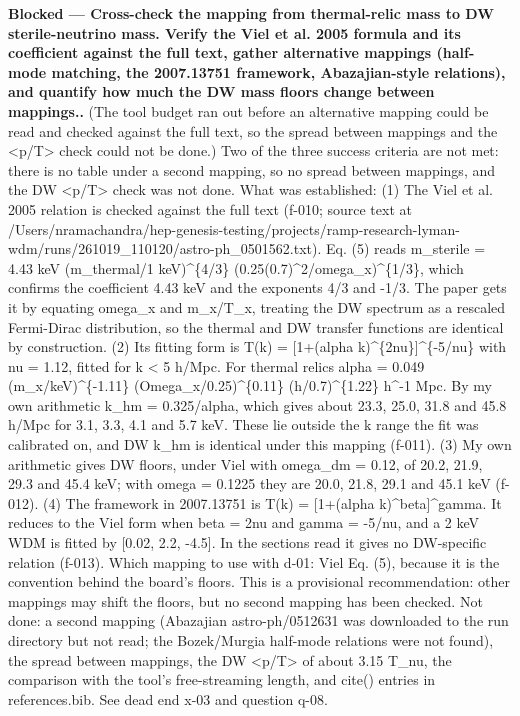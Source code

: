 \documentclass[11pt,a4paper]{article}
\begin{document}
\textbf{Blocked --- Cross-check the mapping from thermal-relic mass to DW sterile-neutrino mass. Verify the Viel et al. 2005 formula and its coefficient against the full text, gather alternative mappings (half-mode matching, the 2007.13751 framework, Abazajian-style relations), and quantify how much the DW mass floors change between mappings..} (The tool budget ran out before an alternative mapping could be read and checked against the full text, so the spread between mappings and the \textless{}p/T\textgreater{} check could not be done.) Two of the three success criteria are not met: there is no table under a second mapping, so no spread between mappings, and the DW \textless{}p/T\textgreater{} check was not done. What was established: (1) The Viel et al. 2005 relation is checked against the full text (f-010; source text at /Users/nramachandra/hep-genesis-testing/projects/ramp-research-lyman-wdm/runs/261019\_110120/astro-ph\_0501562.txt). Eq. (5) reads m\_sterile = 4.43 keV (m\_thermal/1 keV)\textasciicircum{}\{4/3\} (0.25(0.7)\textasciicircum{}2/omega\_x)\textasciicircum{}\{1/3\}, which confirms the coefficient 4.43 keV and the exponents 4/3 and -1/3. The paper gets it by equating omega\_x and m\_x/T\_x, treating the DW spectrum as a rescaled Fermi-Dirac distribution, so the thermal and DW transfer functions are identical by construction. (2) Its fitting form is T(k) = [1+(alpha k)\textasciicircum{}\{2nu\}]\textasciicircum{}\{-5/nu\} with nu = 1.12, fitted for k \textless{} 5 h/Mpc. For thermal relics alpha = 0.049 (m\_x/keV)\textasciicircum{}\{-1.11\} (Omega\_x/0.25)\textasciicircum{}\{0.11\} (h/0.7)\textasciicircum{}\{1.22\} h\textasciicircum{}-1 Mpc. By my own arithmetic k\_hm = 0.325/alpha, which gives about 23.3, 25.0, 31.8 and 45.8 h/Mpc for 3.1, 3.3, 4.1 and 5.7 keV. These lie outside the k range the fit was calibrated on, and DW k\_hm is identical under this mapping (f-011). (3) My own arithmetic gives DW floors, under Viel with omega\_dm = 0.12, of 20.2, 21.9, 29.3 and 45.4 keV; with omega = 0.1225 they are 20.0, 21.8, 29.1 and 45.1 keV (f-012). (4) The framework in 2007.13751 is T(k) = [1+(alpha k)\textasciicircum{}beta]\textasciicircum{}gamma. It reduces to the Viel form when beta = 2nu and gamma = -5/nu, and a 2 keV WDM is fitted by [0.02, 2.2, -4.5]. In the sections read it gives no DW-specific relation (f-013). Which mapping to use with d-01: Viel Eq. (5), because it is the convention behind the board's floors. This is a provisional recommendation: other mappings may shift the floors, but no second mapping has been checked. Not done: a second mapping (Abazajian astro-ph/0512631 was downloaded to the run directory but not read; the Bozek/Murgia half-mode relations were not found), the spread between mappings, the DW \textless{}p/T\textgreater{} of about 3.15 T\_nu, the comparison with the tool's free-streaming length, and cite() entries in references.bib. See dead end x-03 and question q-08.
\end{document}
